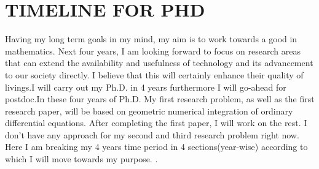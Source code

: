 \documentclass[PhD]{iitmdiss}
\begin{document}
\appendix
\chapter{TIMELINE FOR PHD}

Having my long term goals in my mind, my aim is to work towards a good in mathematics. Next four years, I am looking forward to focus on research areas that can extend the availability and usefulness of technology and its advancement to our society directly. I believe that this will certainly enhance their quality of livings.I will carry out my Ph.D. in 4 years furthermore I will go-ahead for postdoc.In these four years of Ph.D. My first research problem, as well as the first research paper, will be based on geometric numerical integration of ordinary differential equations. After completing the first paper, I will work on the rest. I don't have any approach for my second and third research problem right now. Here I am breaking my 4 years time period in 4 sections(year-wise) according to which I will move towards my purpose.
.
\end{document}
